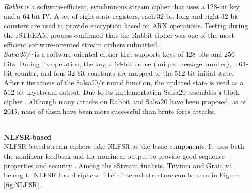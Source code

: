 \emph{Rabbit} is a software-efficient, synchronous stream cipher that uses a 128-bit key and a 64-bit IV. A set of eight state registers, each 32-bit long and eight 32-bit counters are used to provide encryption based on ARX operations. Testing during the eSTREAM process confirmed that the Rabbit cipher was one of the most efficient software-oriented stream ciphers submitted \cite{boesgaard2008rabbit}.\\

\emph{Salsa20/r} is a software-oriented cipher that supports keys of 128 bits and 256 bits. During its operation, the key, a 64-bit nonce (unique message number), a 64-bit counter, and four 32-bit constants are mapped to the 512-bit initial state. After r iterations of the Salsa20/r round function, the updated state is used as a 512-bit keystream output. Due to its implementation Salsa20 resembles a block cipher \cite{bernstein2008salsa20}.
Although many attacks on Rabbit and Salsa20 have been proposed, as of 2015, none of them have been more successful than brute force attacks. \\\\

\clearpage

\textbf{NLFSR-based} \\

NLFSR-based stream ciphers take NLFSR as the basic components. It uses both the nonlinear feedback and the nonlinear output to provide good sequence properties and security \cite{jiao2020stream}.  Among the eStream finalists, Trivium and Grain v1 belong to NLFSR-based ciphers. Their internal structure can be seen in Figure \ref{fig:NLFSR}.


